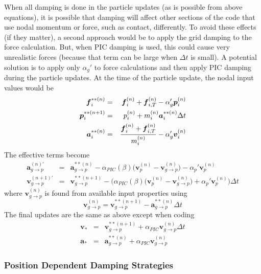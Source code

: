 \documentclass[11pt]{article}
\renewcommand{\vec}[1]{\boldsymbol{#1}}
\begin{document}
When all damping is done in the particle updates (as is possible from above equations), it is possible that damping will affect other sections of the code that use nodal momentum or force, such as contact, differently. To avoid these effects (if they matter), a second approach would be to apply the grid damping to the force calculation. But, when PIC damping is used, this could cause very unrealistic forces (because that term can be large when $\Delta t$ is small). A potential solution is to apply only $\alpha_g'$ to force calculations and then apply PIC damping during the particle updates. At the time of the particle update, the nodal input values would be
\begin{eqnarray}
    \vec f_i^{**(n)} & = & \vec f_{i}^{(n)} + \vec f_{i,T}^{(n)} - \alpha_g'\vec p_i^{(n)} \\
    \vec p_i^{**(n+1)} & = &  p_i^{(n)} +  m_i^{(n)}\vec a_i^{**(n)}\Delta t \\
    \vec a_i^{**(n)} & = & { \vec f_{i}^{(n)} + \vec f_{i,T}^{(n)} \over m_i^{(n)}} -  \alpha_g'\vec v_i^{(n)}
\end{eqnarray}
The effective terms become
\begin{eqnarray}
    \vec{a}_{g\to p}^{(n)'} & = &  \vec{a}_{g\to p}^{**(n)} - \alpha_{PIC}(\beta)\bigl(\vec v_p^{(n)}-\vec v_{g\to p}^{(n)}\bigr) -   \alpha_p'\vec{v}_p^{(n)} \\
    \vec v_{g\to p}^{(n+1)'} & = & \vec v_{g\to p}^{**(n+1)} - \biggl(\alpha_{PIC}(\beta)\bigl(\vec v_p^{(n)}-\vec v_{g\to p}^{(n)}\bigr)  + \alpha_p'\vec{v}_p^{(n)}\biggr)\Delta t 
\end{eqnarray}
where $\vec v_{g\to p}^{(n)}$ is found from available input properties using
\begin{equation}
 \vec v_{g\to p}^{(n)}  =  \vec v_{g\to p}^{**(n+1)}  - \vec{a}_{g\to p}^{**(n)}\Delta t
\end{equation}
The final updates are the same as above except when coding
\begin{eqnarray}
   \vec{v}_*& = & \vec v_{g\to p}^{**(n+1)} +  \alpha_{PIC}\vec{v}_{g\to p}^{(n)}\Delta t   \\
   \vec{a}_* & = & \vec{a}_{g\to p}^{**(n)} + \alpha_{PIC}\vec{v}_{g\to p}^{(n)} 
\end{eqnarray}

\subsubsection{Position Dependent Damping Strategies}
\end{document}
